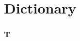 
\part{Dictionary}

\pagestyle{headings}
\nouppercaseheads


\begin{multicols*}{2}

\section{T}



\end{multicols*}